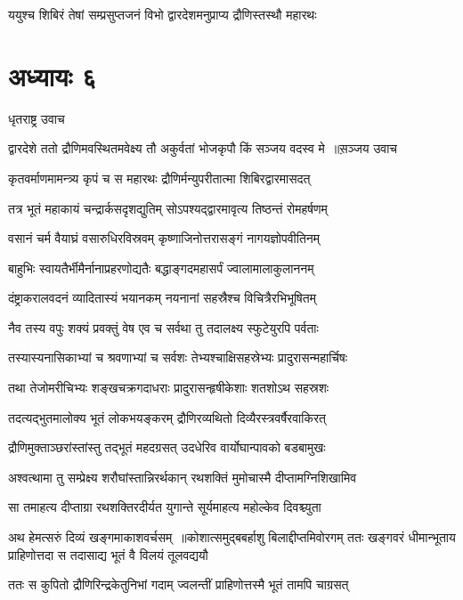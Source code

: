 \twolineshloka
{ययुश्च शिबिरं तेषां सम्प्रसुप्तजनं विभो}
{द्वारदेशमनुप्राप्य द्रौणिस्तस्थौ महारथः}


\chapter{अध्यायः ६}
\twolineshloka
{धृतराष्ट्र उवाच}
{}


\threelineshloka
{द्वारदेशे ततो द्रौणिमवस्थितमवेक्ष्य तौ}
{अकुर्वतां भोजकृपौ किं सञ्जय वदस्व मे ॥स़ञ्जय उवाच}
{}


\twolineshloka
{कृतवर्माणमामन्त्र्य कृपं च स महारथः}
{द्रौणिर्मन्युपरीतात्मा शिबिरद्वारमासदत्}


\twolineshloka
{तत्र भूतं महाकायं चन्द्रार्कसदृशद्युतिम्}
{सोऽपश्यद्द्वारमावृत्य तिष्ठन्तं रोमहर्षणम्}


\twolineshloka
{वसानं चर्म वैयाघ्रं वसारुधिरविस्रवम्}
{कृष्णाजिनोत्तरासङ्गं नागयज्ञोपवीतिनम्}


\twolineshloka
{बाहुभिः स्वायतैर्भीमैर्नानाप्रहरणोद्यतैः}
{बद्धाङ्गदमहासर्पं ज्वालामालाकुलाननम्}


\twolineshloka
{दंष्ट्राकरालवदनं व्यादितास्यं भयानकम्}
{नयनानां सहस्रैश्च विचित्रैरभिभूषितम्}


\twolineshloka
{नैव तस्य वपुः शक्यं प्रवक्तुं वेष एव च}
{सर्वथा तु तदालक्ष्य स्फुटेयुरपि पर्वताः}


\twolineshloka
{तस्यास्यनासिकाभ्यां च श्रवणाभ्यां च सर्वशः}
{तेभ्यश्चाक्षिसहस्रेभ्यः प्रादुरासन्महार्चिषः}


\twolineshloka
{तथा तेजोमरीचिभ्यः शङ्खचक्रगदाधराः}
{प्रादुरासन्हृषीकेशाः शतशोऽथ सहस्रशः}


\twolineshloka
{तदत्यद्भुतमालोक्य भूतं लोकभयङ्करम्}
{द्रौणिरव्यथितो दिव्यैरस्त्रवर्षैरवाकिरत्}


\twolineshloka
{द्रौणिमुक्ताञ्छरांस्तांस्तु तद्भूतं महदग्रसत्}
{उदधेरिव वार्योघान्पावको बडबामुखः}


\twolineshloka
{अश्वत्थामा तु सम्प्रेक्ष्य शरौघांस्तान्निरर्थकान्}
{रथशक्तिं मुमोचास्मै दीप्तामग्निशिखामिव}


\twolineshloka
{सा तमाहत्य दीप्ताग्रा रथशक्तिरदीर्यत}
{युगान्ते सूर्यमाहत्य महोल्केव दिवश्च्युता}


अथ हेमत्सरुं दिव्यं खङ्गमाकाशवर्चसम् ॥कोशात्समुद्बबर्हाशु बिलाद्दीप्तमिवोरगम्
\twolineshloka
{ततः खङ्गवरं धीमान्भूताय प्राहिणोत्तदा}
{स तदासाद्य भूतं वै विलयं तूलवद्ययौ}


\twolineshloka
{ततः स कुपितो द्रौणिरिन्द्रकेतुनिभां गदाम्}
{ज्वलन्तीं प्राहिणोत्तस्मै भूतं तामपि चाग्रसत्}


